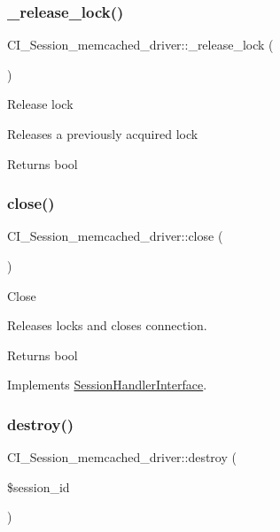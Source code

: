 \subsubsection{\texorpdfstring{\+\_\+release\+\_\+lock()}{\_release\_lock()}}
{\footnotesize\ttfamily C\+I\+\_\+\+Session\+\_\+memcached\+\_\+driver\+::\+\_\+release\+\_\+lock (\begin{DoxyParamCaption}{ }\end{DoxyParamCaption})\hspace{0.3cm}{\ttfamily [protected]}}

Release lock

Releases a previously acquired lock

\begin{DoxyReturn}{Returns}
bool 
\end{DoxyReturn}
\mbox{\label{class_c_i___session__memcached__driver_ad674ff1dedbad8860d4b16c0312dbd95}} 
\subsubsection{\texorpdfstring{close()}{close()}}
{\footnotesize\ttfamily C\+I\+\_\+\+Session\+\_\+memcached\+\_\+driver\+::close (\begin{DoxyParamCaption}{ }\end{DoxyParamCaption})}

Close

Releases locks and closes connection.

\begin{DoxyReturn}{Returns}
bool 
\end{DoxyReturn}


Implements \mbox{\hyperlink{interface_session_handler_interface}{Session\+Handler\+Interface}}.

\mbox{\label{class_c_i___session__memcached__driver_ae640c7d88fe88e790e97482e5912af93}} 
\subsubsection{\texorpdfstring{destroy()}{destroy()}}
{\footnotesize\ttfamily C\+I\+\_\+\+Session\+\_\+memcached\+\_\+driver\+::destroy (\begin{DoxyParamCaption}\item[{}]{\$session\+\_\+id }\end{DoxyParamCaption})}

